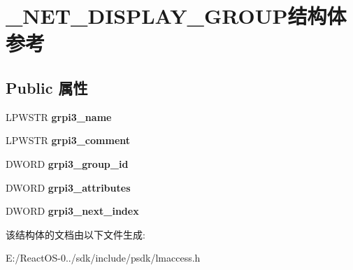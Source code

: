 \hypertarget{struct___n_e_t___d_i_s_p_l_a_y___g_r_o_u_p}{}\section{\+\_\+\+N\+E\+T\+\_\+\+D\+I\+S\+P\+L\+A\+Y\+\_\+\+G\+R\+O\+U\+P结构体 参考}
\label{struct___n_e_t___d_i_s_p_l_a_y___g_r_o_u_p}
\subsection*{Public 属性}
\begin{DoxyCompactItemize}
\item 
\mbox{\label{struct___n_e_t___d_i_s_p_l_a_y___g_r_o_u_p_a615c195c34221733cb1e23ea2f264895}} 
L\+P\+W\+S\+TR {\bfseries grpi3\+\_\+name}
\item 
\mbox{\label{struct___n_e_t___d_i_s_p_l_a_y___g_r_o_u_p_a423d0551c9359f6fca5a44ac6bd7faf9}} 
L\+P\+W\+S\+TR {\bfseries grpi3\+\_\+comment}
\item 
\mbox{\label{struct___n_e_t___d_i_s_p_l_a_y___g_r_o_u_p_a1d6a593358693d11d9d47f1c377e8987}} 
D\+W\+O\+RD {\bfseries grpi3\+\_\+group\+\_\+id}
\item 
\mbox{\label{struct___n_e_t___d_i_s_p_l_a_y___g_r_o_u_p_aea1e9b65ced818a5d5d7e1be0b40b6b5}} 
D\+W\+O\+RD {\bfseries grpi3\+\_\+attributes}
\item 
\mbox{\label{struct___n_e_t___d_i_s_p_l_a_y___g_r_o_u_p_ae82b176430c256a9840481237d8695a2}} 
D\+W\+O\+RD {\bfseries grpi3\+\_\+next\+\_\+index}
\end{DoxyCompactItemize}


该结构体的文档由以下文件生成\+:\begin{DoxyCompactItemize}
\item 
E\+:/\+React\+O\+S-\/0../sdk/include/psdk/lmaccess.\+h\end{DoxyCompactItemize}
